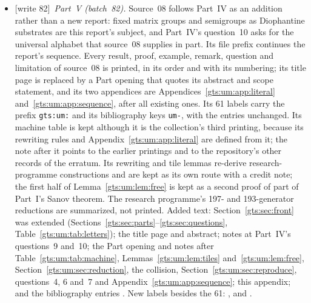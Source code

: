 \documentclass[11pt,letterpaper]{article}
\theoremstyle{definition}
\theoremstyle{remark}
\newcommand{\wtagc}{\textup{[write 82]}}
\begin{document}
\begin{itemize}
\item \wtagc\ \emph{Part~V (batch~82).} Source~08 follows Part~IV as an addition rather than a new report: fixed matrix groups and semigroups as Diophantine substrates are this report's subject, and Part~IV's question~10 asks for the universal alphabet that source~08 supplies in part. Its file prefix  continues the report's sequence. Every result, proof, example, remark, question and limitation of source~08 is printed, in its order and with its numbering; its title page is replaced by a Part opening that quotes its abstract and scope statement, and its two appendices are Appendices~\ref{gts:um:app:literal} and~\ref{gts:um:app:sequence}, after all existing ones. Its 61 labels carry the prefix \texttt{gts:um:} and its bibliography keys \texttt{um-}, with the entries unchanged. Its machine table is kept although it is the collection's third printing, because its rewriting rules and Appendix~\ref{gts:um:app:literal} are defined from it; the note after it points to the earlier printings and to the repository's other records of the erratum. Its rewriting and tile lemmas re-derive research-programme constructions and are kept as its own route with a credit note; the first half of Lemma~\ref{gts:um:lem:free} is kept as a second proof of part of Part~I's Sanov theorem. The research programme's 197- and 193-generator reductions are summarized, not printed. Added text: Section~\ref{gts:sec:front} was extended (Sections~\ref{gts:sec:parts}--\ref{gts:sec:questions}, Table~\ref{gts:um:tab:letters}); the title page and abstract; notes at Part~IV's questions~9 and~10; the Part opening and notes after Table~\ref{gts:um:tab:machine}, Lemmas~\ref{gts:um:lem:tiles} and~\ref{gts:um:lem:free}, Section~\ref{gts:um:sec:reduction}, the collision, Section~\ref{gts:um:sec:reproduce}, questions~4, 6 and~7 and Appendix~\ref{gts:um:app:sequence}; this appendix; and the bibliography entries \cite{qoc,repo-nw15,repo-gpcp,repo-revmg,repo-ds193}. New labels besides the 61: ,  and .

\end{itemize}
\end{document}
